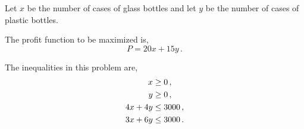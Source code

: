 %
%

\usetikzlibrary{patterns}

\begin{subquestions}


\subquestion

Let $x$ be the number of cases of glass bottles and let $y$ be the number of cases of plastic bottles.

\begin{subsubquestions}

\subsubquestion

\begin{subsubsubquestions}


\subsubsubquestion

The profit function to be maximized is,
\begin{equation}
	P = 20x + 15y \,.
\end{equation}


\subsubsubquestion

The inequalities in this problem are,
\begin{align}
	x & \geq 0 \,, \nonumber \\
	y & \geq 0 \,, \nonumber \\
	4x + 4y & \leq 3000 \,, \nonumber \\
	3x + 6y & \leq 3000 \,.
\end{align}


\end{subsubsubquestions}
\end{subsubquestions}
\end{subquestions}
